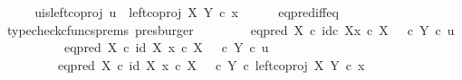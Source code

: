 \begin{isabellebody}
\ \ \isamarkupfalse%
\ \isamarkupfalse%
\ u{\isacharunderscore}{\kern0pt}is{\isacharunderscore}{\kern0pt}left{\isacharunderscore}{\kern0pt}coproj{\isacharcolon}{\kern0pt}\ {\isachardoublequoteopen}u\ {\isacharequal}{\kern0pt}\ left{\isacharunderscore}{\kern0pt}coproj\ X\ Y\ {\isasymcirc}\isactrlsub c\ x{\isachardoublequoteclose}\isanewline
\ \ \ \ \isamarkupfalse%
\ eq{\isacharunderscore}{\kern0pt}pred{\isacharunderscore}{\kern0pt}iff{\isacharunderscore}{\kern0pt}eq\ \isamarkupfalse%
\ {\isacharparenleft}{\kern0pt}typecheck{\isacharunderscore}{\kern0pt}cfuncs{\isacharunderscore}{\kern0pt}prems{\isacharcomma}{\kern0pt}\ presburger{\isacharparenright}{\kern0pt}\isanewline
\ \ \isanewline
\ \ \isamarkupfalse%
\ {\isachardoublequoteopen}{\isasymt}\ {\isacharequal}{\kern0pt}\ {\isacharparenleft}{\kern0pt}eq{\isacharunderscore}{\kern0pt}pred\ X\ {\isasymcirc}\isactrlsub c\ {\isasymlangle}id\isactrlsub c\ X{\isacharcomma}{\kern0pt}x\ {\isasymcirc}\isactrlsub c\ {\isasymbeta}\isactrlbsub X\isactrlesub {\isasymrangle}{\isacharparenright}{\kern0pt}\ {\isasymamalg}\ {\isacharparenleft}{\kern0pt}{\isasymf}\ {\isasymcirc}\isactrlsub c\ {\isasymbeta}\isactrlbsub Y\isactrlesub {\isacharparenright}{\kern0pt}\ {\isasymcirc}\isactrlsub c\ u{\isachardoublequoteclose}\isanewline
\ \ \isamarkupfalse%
\ {\isacharminus}{\kern0pt}\isanewline
\ \ \ \ \isamarkupfalse%
\ {\isachardoublequoteopen}{\isacharparenleft}{\kern0pt}{\isacharparenleft}{\kern0pt}eq{\isacharunderscore}{\kern0pt}pred\ X\ {\isasymcirc}\isactrlsub c\ {\isasymlangle}id\ X{\isacharcomma}{\kern0pt}\ x\ {\isasymcirc}\isactrlsub c\ {\isasymbeta}\isactrlbsub X\isactrlesub {\isasymrangle}{\isacharparenright}{\kern0pt}\ {\isasymamalg}\ {\isacharparenleft}{\kern0pt}{\isasymf}\ {\isasymcirc}\isactrlsub c\ {\isasymbeta}\isactrlbsub Y\isactrlesub {\isacharparenright}{\kern0pt}{\isacharparenright}{\kern0pt}\ {\isasymcirc}\isactrlsub c\ u\isanewline
\ \ \ \ \ \ \ \ {\isacharequal}{\kern0pt}\ {\isacharparenleft}{\kern0pt}{\isacharparenleft}{\kern0pt}eq{\isacharunderscore}{\kern0pt}pred\ X\ {\isasymcirc}\isactrlsub c\ {\isasymlangle}id\ X{\isacharcomma}{\kern0pt}\ x\ {\isasymcirc}\isactrlsub c\ {\isasymbeta}\isactrlbsub X\isactrlesub {\isasymrangle}{\isacharparenright}{\kern0pt}\ {\isasymamalg}\ {\isacharparenleft}{\kern0pt}{\isasymf}\ {\isasymcirc}\isactrlsub c\ {\isasymbeta}\isactrlbsub Y\isactrlesub {\isacharparenright}{\kern0pt}{\isacharparenright}{\kern0pt}\ {\isasymcirc}\isactrlsub c\ left{\isacharunderscore}{\kern0pt}coproj\ X\ Y\ {\isasymcirc}\isactrlsub c\ x{\isachardoublequoteclose}\isanewline

\end{isabellebody}
